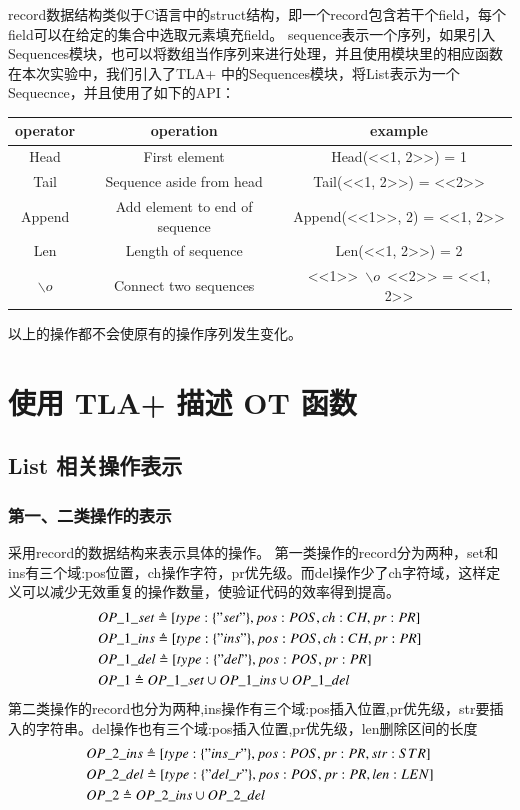 record数据结构类似于C语言中的struct结构，即一个record包含若干个field，每个field可以在给定的集合中选取元素填充field。
sequence表示一个序列，如果引入Sequences模块，也可以将数组当作序列来进行处理，并且使用模块里的相应函数
在本次实验中，我们引入了TLA+ 中的Sequences模块，将List表示为一个Sequecnce，并且使用了如下的API：\\
\begin{tabular}{ccc}
\hline
operator& operation& example \\
\hline  
 Head& First element &Head(<<1, 2>>) = 1\\
 Tail& Sequence aside from head &Tail(<<1, 2>>) = <<2>>\\
 Append& Add element to end of sequence &Append(<<1>>, 2) = <<1, 2>>\\ 
 Len& Length of sequence &Len(<<1, 2>>) = 2\\
 $\backslash o$& Connect two sequences &<<1>>\ $\backslash o$\ <<2>> = <<1, 2>>\\
\hline %
\end{tabular}
\par 以上的操作都不会使原有的操作序列发生变化。

\section{使用 TLA+ 描述 OT 函数}
\subsection{List 相关操作表示}
\subsubsection{第一、二类操作的表示}
采用record的数据结构来表示具体的操作。
第一类操作的record分为两种，set和ins有三个域:pos位置，ch操作字符，pr优先级。而del操作少了ch字符域，这样定义可以减少无效重复的操作数量，使验证代码的效率得到提高。
\begin{align*}
&OP\_1\_set \triangleq [type: \{"set"\}, pos: POS, ch: CH, pr:PR] \\
&OP\_1\_ins \triangleq [type: \{"ins"\}, pos: POS, ch: CH, pr:PR] \\
&OP\_1\_del \triangleq [type: \{"del"\}, pos: POS, pr:PR] \\
&OP\_1 \triangleq OP\_1\_set \cup OP\_1\_ins \cup OP\_1\_del
\end{align*}
第二类操作的record也分为两种,ins操作有三个域:pos插入位置,pr优先级，str要插入的字符串。del操作也有三个域:pos插入位置,pr优先级，len删除区间的长度
\begin{align*}
&OP\_2\_ins \triangleq [type: \{"ins\_r"\}, pos: POS, pr:PR, str:STR] \\
&OP\_2\_del \triangleq [type: \{"del\_r"\}, pos: POS, pr:PR, len:LEN] \\
&OP\_2 \triangleq  OP\_2\_ins \cup OP\_2\_del 
\end{align*}


